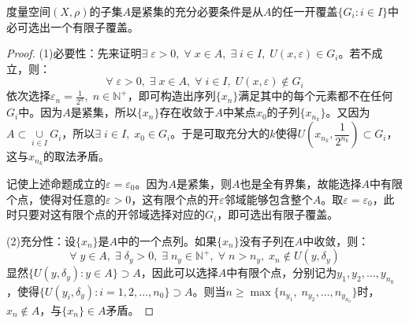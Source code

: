 \begin{theorem}[有限覆盖定理]
	度量空间$(X,\rho)$的子集$A$是紧集的充分必要条件是从$A$的任一开覆盖$\{G_i:i\in I\}$中必可选出一个有限子覆盖。
\end{theorem}
\begin{proof}
	(1)必要性：先来证明$\exists\;\varepsilon>0,\;\forall\;x\in A,\;\exists\;i\in I,\;U(x,\varepsilon)\in G_i$。若不成立，则：
	\begin{equation*}
		\forall\;\varepsilon>0,\;\exists\;x\in A,\;\forall\;i\in I,\;U(x,\varepsilon)\notin G_i
	\end{equation*}
	依次选择$\varepsilon_n=\frac{1}{2^n},\;n\in\mathbb{N}^+$，即可构造出序列$\{x_n\}$满足其中的每个元素都不在任何$G_i$中。因为$A$是紧集，所以$\{x_n\}$存在收敛于$A$中某点$x_0$的子列$\{x_{n_k}\}$。又因为$A\subset\underset{i\in I}{\cup}G_i$，所以$\exists\;i\in I,\;x_0\in G_i$。于是可取充分大的$k$使得$U\left(x_{n_k},\dfrac{1}{2^{n_k}}\right)\subset G_i$，这与$x_{n_k}$的取法矛盾。\par
	记使上述命题成立的$\varepsilon=\varepsilon_0$。因为$A$是紧集，则$A$也是全有界集，故能选择$A$中有限个点，使得对任意的$\varepsilon>0$，这有限个点的开$\varepsilon$邻域能够包含整个$A$。取$\varepsilon=\varepsilon_0$，此时只要对这有限个点的开邻域选择对应的$G_i$，即可选出有限子覆盖。\par
	(2)充分性：设$\{x_n\}$是$A$中的一个点列。如果$\{x_n\}$没有子列在$A$中收敛，则：
	\begin{equation*}
		\forall\;y\in A,\;\exists\;\delta_y>0,\;\exists\;n_y\in\mathbb{N}^+,\;\forall\;n>n_y,\;x_n\notin U(y,\delta_y)
	\end{equation*}
	显然$\{U(y,\delta_y):y\in A\}\supset A$，因此可以选择$A$中有限个点，分别记为$y_1,y_2,\dots,y_{n_0}$，使得$\{U(y_i,\delta_y):i=1,2,\dots,n_0\}\supset A$。则当$n\geqslant
	\max\{n_{y_1},\;n_{y_2},\dots,n_{y_{n_0}}\}$时，$x_n\notin A$，与$\{x_n\}\in A$矛盾。
\end{proof}
